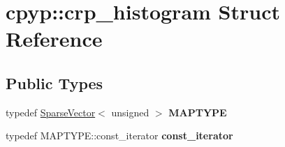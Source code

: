 \hypertarget{structcpyp_1_1crp__histogram}{}\section{cpyp\+:\+:crp\+\_\+histogram Struct Reference}
\label{structcpyp_1_1crp__histogram}
\subsection*{Public Types}
\begin{DoxyCompactItemize}
\item 
\mbox{\label{structcpyp_1_1crp__histogram_a4c1cc0eb139cd8387e961a393afe73c0}} 
typedef \mbox{\hyperlink{classcpyp_1_1_sparse_vector}{Sparse\+Vector}}$<$ unsigned $>$ {\bfseries M\+A\+P\+T\+Y\+PE}
\item 
\mbox{\label{structcpyp_1_1crp__histogram_a4277c3d2e1d8f8cdfd0521a5806a6425}} 
typedef M\+A\+P\+T\+Y\+P\+E\+::const\+\_\+iterator {\bfseries const\+\_\+iterator}
\end{DoxyCompactItemize}
